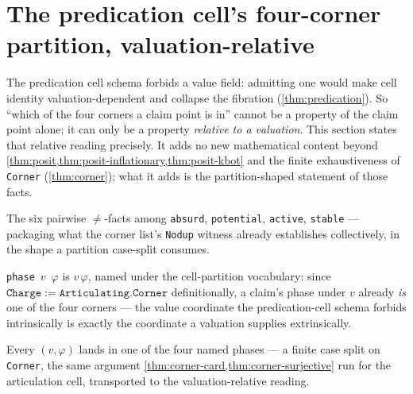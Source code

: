 \section{The predication cell's four-corner partition, valuation-relative}

The predication cell schema forbids a value field: admitting one would make
cell identity valuation-dependent and collapse the fibration
(\cref{thm:predication}). So ``which of the four corners a claim point is
in'' cannot be a property of the claim point alone; it can only be a property
\emph{relative to a valuation}. This section states that relative reading
precisely. It adds no new mathematical content beyond
\cref{thm:posit,thm:posit-inflationary,thm:posit-kbot} and the finite
exhaustiveness of \texttt{Corner} (\cref{thm:corner}); what it adds is the
partition-shaped statement of those facts.

\begin{proposition}\label{thm:corner-pairwise-ne}\leanok{}
The six pairwise \(\ne\)-facts among \texttt{absurd}, \texttt{potential},
\texttt{active}, \texttt{stable} --- packaging what the corner list's
\texttt{Nodup} witness already establishes collectively, in the shape a
partition case-split consumes.
\end{proposition}

\begin{definition}\label{thm:phase}\leanok{}
\texttt{phase}~\(v\)~\(\varphi\) is \(v\,\varphi\), named under the
cell-partition vocabulary: since \(\mathtt{Charge} :=
\mathtt{Articulating.Corner}\) definitionally, a claim's phase under \(v\)
already \emph{is} one of the four corners --- the value coordinate the
predication-cell schema forbids intrinsically is exactly the coordinate a
valuation supplies extrinsically.
\end{definition}

\begin{theorem}[Exhaustiveness]\label{thm:phase-cases}\leanok{}
Every \((v, \varphi)\) lands in one of the four named phases --- a finite
case split on \texttt{Corner}, the same argument
\cref{thm:corner-card,thm:corner-surjective} run for the articulation cell,
transported to the valuation-relative reading.
\end{theorem}

